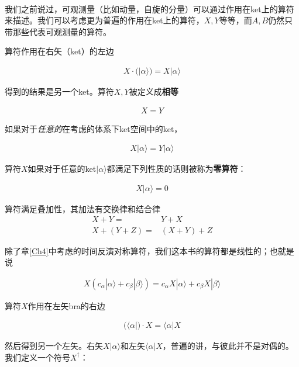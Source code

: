 \documentclass[UTF8,twoside]{ctexart}
\begin{document}
\ 


\noindent 我们之前说过，可观测量（比如动量，自旋的分量）可以通过作用在ket上的算符来描述。我们可以考虑更为普遍的作用在ket上的算符，$X, Y$等等，而$A,B$仍然只带那些代表可观测量的算符。

算符作用在右矢（ket）的左边

\begin{align}
X\cdot(|\alpha\rangle)=X|\alpha\rangle
\end{align}

\noindent 得到的结果是另一个ket。算符$X, Y$被定义成{\bf 相等}

\begin{align}
X=Y
\end{align}

\noindent 如果对于{\emph{任意的}}在考虑的体系下ket空间中的ket，

\begin{align}
X|\alpha\rangle = Y|\alpha\rangle
\end{align}

\noindent 算符$X$如果对于任意的ket$|\alpha\rangle$都满足下列性质的话则被称为{\bf 零算符}：

\begin{align}
X|\alpha\rangle = 0
\end{align}

\noindent 算符满足叠加性，其加法有交换律和结合律
\setcounter{equation}{20}
\begin{subequations}
\begin{align}
X+Y=&Y+X\\
X+(Y+Z)=&(X+Y)+Z
\end{align}
\end{subequations}

\noindent 除了章{\ref{Ch4}}中考虑的时间反演对称算符，我们这本书的算符都是线性的；也就是说

\begin{align}
X(c_\alpha|\alpha\rangle+c_\beta|\beta\rangle)=c_\alpha X|\alpha\rangle + c_\beta X|\beta\rangle
\end{align}

算符$X$作用在左矢bra的右边

\begin{align}
(\langle\alpha|)\cdot X=\langle\alpha|X
\end{align}

\noindent 然后得到另一个左矢。右矢$X|\alpha\rangle$和左矢$\langle\alpha|X$，普遍的讲，与彼此并不是对偶的。我们定义一个符号$X^\dagger$：
\end{document}
